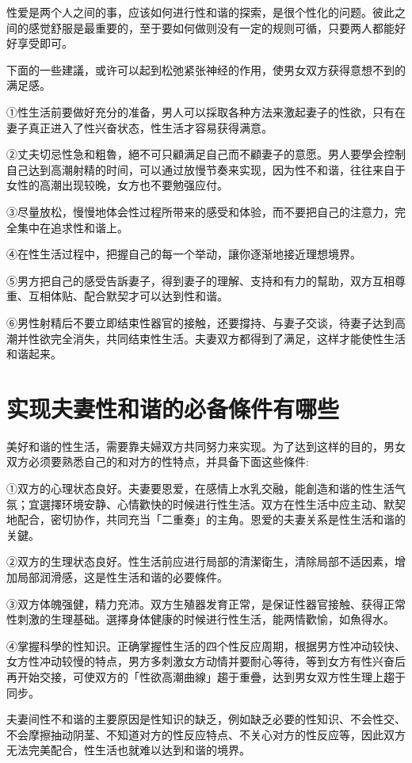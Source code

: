 \documentclass[12pt,UTF8]{ctexbook}
\begin{document}
性爱是两个人之间的事，应该如何进行性和谐的探索，是很个性化的问题。彼此之间的感觉舒服是最重要的，至于要如何做则没有一定的规则可循，只要两人都能好好享受即可。

下面的一些建議，或许可以起到松弛紧张神经的作用，使男女双方获得意想不到的满足感。

①性生活前要做好充分的准备，男人可以採取各种方法来激起妻子的性欲，只有在妻子真正进入了性兴奋状态，性生活才容易获得满意。

②丈夫切忌性急和粗魯，絕不可只顧满足自己而不顧妻子的意愿。男人要學会控制自己达到高潮射精的时间，可以通过放慢节奏来实现，因为性不和谐，往往来自于女性的高潮出现较晚，女方也不要勉强应付。

③尽量放松，慢慢地体会性过程所带来的感受和体验，而不要把自己的注意力，完全集中在追求性和谐上。

④在性生活过程中，把握自己的每一个举动，讓你逐渐地接近理想境界。

⑤男方把自己的感受告訴妻子，得到妻子的理解、支持和有力的幫助，双方互相尊重、互相体贴、配合默契才可以达到性和谐。

⑥男性射精后不要立即结束性器官的接触，还要撐持、与妻子交谈，待妻子达到高潮并性欲完全消失，共同结束性生活。夫妻双方都得到了满足，这样才能使性生活和谐起来。

\section{实现夫妻性和谐的必备條件有哪些}

美好和谐的性生活，需要靠夫婦双方共同努力来实现。为了达到这样的目的，男女双方必须要熟悉自己的和对方的性特点，并具备下面这些條件:

①双方的心理状态良好。夫妻要恩爱，在感情上水乳交融，能創造和谐的性生活气氛；宜選擇环境安静、心情歡快的时候进行性生活。双方在性生活中应主动、默契地配合，密切协作，共同充当「二重奏」的主角。恩爱的夫妻关系是性生活和谐的关鍵。

②双方的生理状态良好。性生活前应进行局部的清潔衛生，清除局部不适因素，增加局部润滑感，这是性生活和谐的必要條件。

③双方体魄强健，精力充沛。双方生殖器发育正常，是保证性器官接触、获得正常性刺激的生理基础。選擇身体健康的时候进行性生活，能两情歡愉，如魚得水。

④掌握科學的性知识。正确掌握性生活的四个性反应周期，根据男方性冲动较快、女方性冲动较慢的特点，男方多刺激女方动情并要耐心等待，等到女方有性兴奋后再开始交接，可使双方的「性欲高潮曲線」趨于重疊，达到男女双方性生理上趨于同步。

夫妻间性不和谐的主要原因是性知识的缺乏，例如缺乏必要的性知识、不会性交、不会摩擦抽动阴茎、不知道对方的性反应特点、不关心对方的性反应等，因此双方无法完美配合，性生活也就难以达到和谐的境界。
\end{document}
